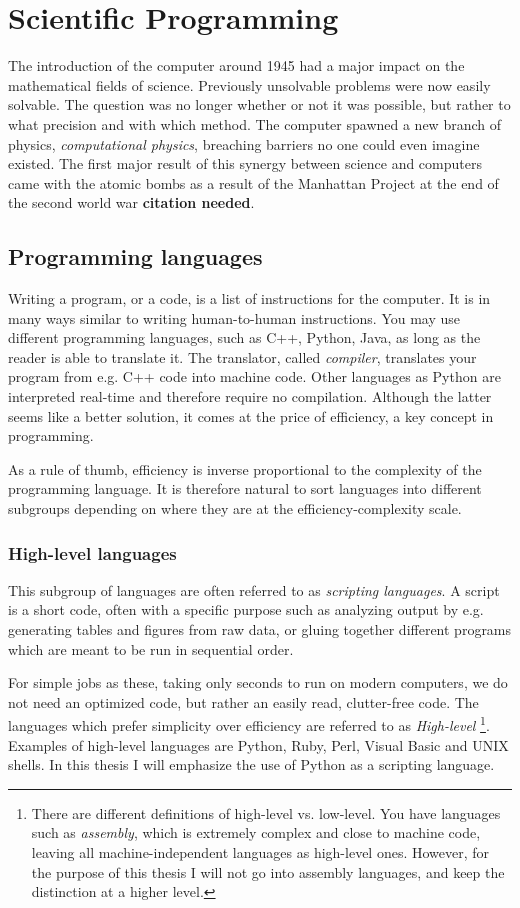 \chapter{Scientific Programming}

The introduction of the computer around 1945 had a major impact on the mathematical fields of science. Previously unsolvable problems were now easily solvable. The question was no longer whether or not it was possible, but rather to what precision and with which method. The computer spawned a new branch of physics, \textit{computational physics}, breaching barriers no one could even imagine existed. The first major result of this synergy between science and computers came with the atomic bombs as a result of the Manhattan Project at the end of the second world war \textbf{citation needed}.       

\section{Programming languages}

Writing a program, or a code, is a list of instructions for the computer. It is in many ways similar to writing human-to-human instructions. You may use different programming languages, such as C++, Python, Java, as long as the reader is able to translate it. The translator, called \textit{compiler}, translates your program from e.g. C++ code into machine code. Other languages as Python are interpreted real-time and therefore require no compilation. Although the latter seems like a better solution, it comes at the price of efficiency, a key concept in programming. 

As a rule of thumb, efficiency is inverse proportional to the complexity of the programming language. It is therefore natural to sort languages into different subgroups depending on where they are at the efficiency-complexity scale.


\subsection{High-level languages}

This subgroup of languages are often referred to as \textit{scripting languages}. A script is a short code, often with a specific purpose such as analyzing output by e.g. generating tables and figures from raw data, or gluing together different programs which are meant to be run in sequential order.

For simple jobs as these, taking only seconds to run on modern computers, we do not need an optimized code, but rather an easily read, clutter-free code. The languages which prefer simplicity over efficiency are referred to as \textit{High-level} \footnote{There are different definitions of high-level vs. low-level. You have languages such as \textit{assembly}, which is extremely complex and close to machine code, leaving all machine-independent languages as high-level ones. However, for the purpose of this thesis I will not go into assembly languages, and keep the distinction at a higher level.}. Examples of high-level languages are Python, Ruby, Perl, Visual Basic and UNIX shells. In this thesis I will emphasize the use of Python as a scripting language.   


